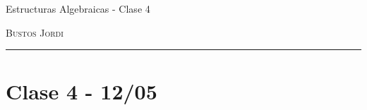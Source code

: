 \documentclass[12pt,a4paper]{book}
\begin{document}
\renewcommand{\contentsname}{\vspace{0cm} Contenido \vspace{-2cm}}

\begin{titlepage}
    \vspace*{2cm}

    \noindent
    \vspace*{0.5cm}

    \vspace{1.5cm}
    \epigraph{Estructuras Algebraicas - Clase 4}%
    {\textsc{Bustos Jordi}}
    \null\vfill
    \vspace*{1cm}
    \noindent
    \hfill
    \begin{minipage}{0.7\linewidth}
        \begin{flushright}
            \printauthor
        \end{flushright}
    \end{minipage}
    \begin{minipage}{0.02\linewidth}
        \rule{1pt}{70pt}
    \end{minipage}
    \titlepagedecoration
\end{titlepage}

\let\cleardoublepage=\clearpage
\tableofcontents
\blankpage

\chapter{Clase 4 - 12/05 }


\blankpage



\nocite{*}
\end{document}
